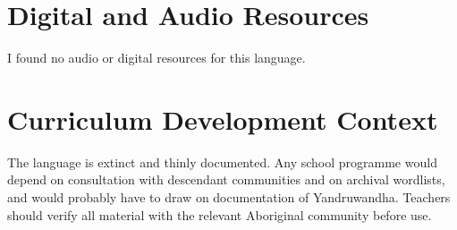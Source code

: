 \documentclass[12pt]{article}
\begin{document}
\section{Digital and Audio Resources}
I found no audio or digital resources for this language.

\section{Curriculum Development Context}
The language is extinct and thinly documented. Any school programme would depend on consultation with descendant communities and on archival wordlists, and would probably have to draw on documentation of Yandruwandha. Teachers should verify all material with the relevant Aboriginal community before use.
\end{document}
